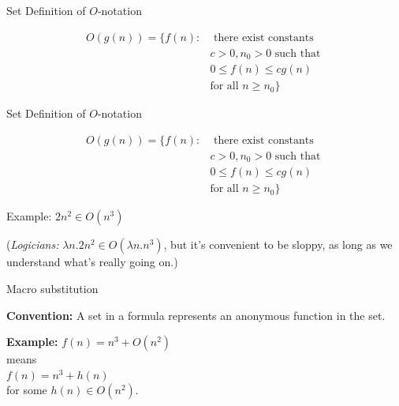 \documentclass{beamer}
\begin{document}
\begin{frame}{Set Definition of $O$-notation}
    \begin{tcolorbox}
        \begin{align*}
            O(g(n)) = \{ f(n): & \text{ there exist constants } \\
                                        & c > 0, n_0 > 0 \text{ such that } \\
                                        & 0 \leq f(n) \leq  cg(n) \\
                                        & \text{for all } n \geq n_0\}
        \end{align*}
    \end{tcolorbox}
\end{frame}

\begin{frame}{Set Definition of $O$-notation}
    \begin{tcolorbox}
        \begin{align*}
            O(g(n)) = \{ f(n): & \text{ there exist constants } \\
                                        & c > 0, n_0 > 0 \text{ such that } \\
                                        & 0 \leq f(n) \leq  cg(n) \\
                                        & \text{for all } n \geq n_0\}
        \end{align*}
    \end{tcolorbox}
    \begin{block}{Example:}
        $2n^2 \in O(n^3)$
    \end{block}
    \vspace{5mm}
    (\textit{Logicians:} $\lambda n.2n^2 \in O(\lambda n.n^3) $, but it's convenient to be sloppy, as long as we understand what's really going on.)
\end{frame}

\begin{frame}{Macro substitution}
    \begin{alertblock}{\textbf{Convention:}}
        A set in a formula represents an anonymous function in the set.
    \end{alertblock}
    \begin{exampleblock}{\textbf{Example:}}
        \vspace{2mm}
        $ f(n) = n^3 + O(n^2) $\\
        means \\
        $ f(n) = n^3 + h(n) $\\
        for some $h(n) \in O(n^2)$.
    \end{exampleblock}
\end{frame}
\end{document}
